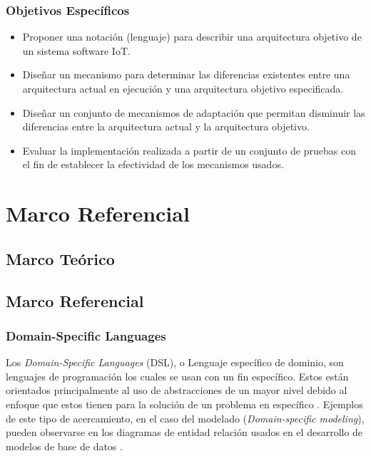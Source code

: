 \documentclass[12pt]{article}
\begin{document}
    \subsubsection{Objetivos Específicos}

    \begin{itemize}
        \item Proponer una notación (lenguaje) para describir una arquitectura objetivo de un sistema software IoT.
        \item Diseñar un mecanismo para determinar las diferencias existentes entre una arquitectura actual en ejecución y una arquitectura objetivo especificada.
        \item Diseñar un conjunto de mecanismos de adaptación que permitan disminuir las diferencias entre la arquitectura actual y la arquitectura objetivo.
        \item Evaluar la implementación realizada a partir de un conjunto de pruebas con el fin de establecer la efectividad de los mecanismos usados.

    \end{itemize}

    \section{Marco Referencial}

    \subsection{Marco Teórico}

    \subsection{Marco Referencial}

    \subsubsection{Domain-Specific Languages} %



    Los \textit{Domain-Specific Languages} (DSL), o Lenguaje específico de dominio, son lenguajes de programación los cuales se usan con un fin específico. Estos están orientados principalmente al uso de abstracciones de un mayor nivel debido al enfoque que estos tienen para la solución de un problema en específico \cite{Kelly2008}. Ejemplos de este tipo de acercamiento, en el caso del modelado (\textit{Domain-specific modeling}), pueden observarse en los diagramas de entidad relación usados en el desarrollo de modelos de base de datos \cite{Celikovic2014ADF}. 
\end{document}
